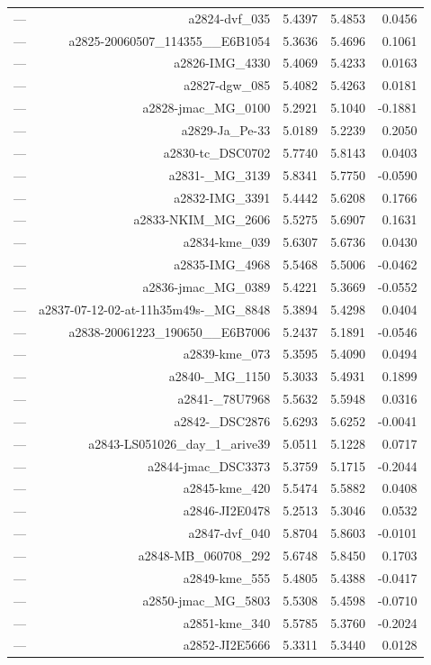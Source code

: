 \begin{table}[htbp]
\begin{tabular}{lrrrr}
— & a2824-dvf_035 & 5.4397 & 5.4853 & 0.0456 \\
— & a2825-20060507_114355__E6B1054 & 5.3636 & 5.4696 & 0.1061 \\
— & a2826-IMG_4330 & 5.4069 & 5.4233 & 0.0163 \\
— & a2827-dgw_085 & 5.4082 & 5.4263 & 0.0181 \\
— & a2828-jmac_MG_0100 & 5.2921 & 5.1040 & -0.1881 \\
— & a2829-Ja_Pe-33 & 5.0189 & 5.2239 & 0.2050 \\
— & a2830-tc_DSC0702 & 5.7740 & 5.8143 & 0.0403 \\
— & a2831-_MG_3139 & 5.8341 & 5.7750 & -0.0590 \\
— & a2832-IMG_3391 & 5.4442 & 5.6208 & 0.1766 \\
— & a2833-NKIM_MG_2606 & 5.5275 & 5.6907 & 0.1631 \\
— & a2834-kme_039 & 5.6307 & 5.6736 & 0.0430 \\
— & a2835-IMG_4968 & 5.5468 & 5.5006 & -0.0462 \\
— & a2836-jmac_MG_0389 & 5.4221 & 5.3669 & -0.0552 \\
— & a2837-07-12-02-at-11h35m49s-_MG_8848 & 5.3894 & 5.4298 & 0.0404 \\
— & a2838-20061223_190650__E6B7006 & 5.2437 & 5.1891 & -0.0546 \\
— & a2839-kme_073 & 5.3595 & 5.4090 & 0.0494 \\
— & a2840-_MG_1150 & 5.3033 & 5.4931 & 0.1899 \\
— & a2841-_78U7968 & 5.5632 & 5.5948 & 0.0316 \\
— & a2842-_DSC2876 & 5.6293 & 5.6252 & -0.0041 \\
— & a2843-LS051026_day_1_arive39 & 5.0511 & 5.1228 & 0.0717 \\
— & a2844-jmac_DSC3373 & 5.3759 & 5.1715 & -0.2044 \\
— & a2845-kme_420 & 5.5474 & 5.5882 & 0.0408 \\
— & a2846-JI2E0478 & 5.2513 & 5.3046 & 0.0532 \\
— & a2847-dvf_040 & 5.8704 & 5.8603 & -0.0101 \\
— & a2848-MB_060708_292 & 5.6748 & 5.8450 & 0.1703 \\
— & a2849-kme_555 & 5.4805 & 5.4388 & -0.0417 \\
— & a2850-jmac_MG_5803 & 5.5308 & 5.4598 & -0.0710 \\
— & a2851-kme_340 & 5.5785 & 5.3760 & -0.2024 \\
— & a2852-JI2E5666 & 5.3311 & 5.3440 & 0.0128 \\

\end{tabular}
\end{table}
